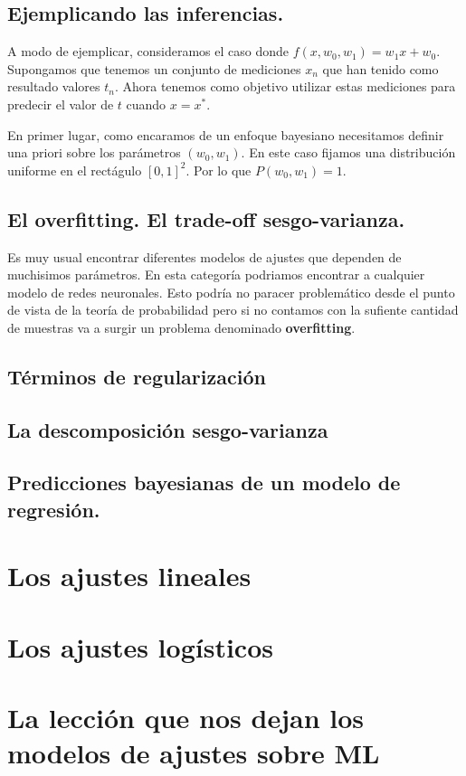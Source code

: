 \subsection{Ejemplicando las inferencias.}
A modo de ejemplicar, consideramos el caso donde $f(x,w_0,w_1) = w_1 x +w_0$. Supongamos que tenemos un conjunto de mediciones $x_n$ que han tenido como resultado valores $t_n$. Ahora tenemos como objetivo utilizar estas mediciones para predecir el valor de $t$ cuando $x=x^*$.

En primer lugar, como encaramos de un enfoque bayesiano necesitamos definir una priori sobre los par\'ametros $(w_0,w_1)$. En este caso fijamos una distribuci\'on uniforme en el rect\'agulo $[0,1]^2$. Por lo que $P(w_0,w_1)=1$.



\subsection{El overfitting. El trade-off sesgo-varianza.}
Es muy usual encontrar diferentes modelos de ajustes que dependen de muchisimos par\'ametros. En esta categor\'ia podriamos encontrar a cualquier modelo de redes neuronales. Esto podr\'ia no paracer problem\'atico desde el punto de vista de la teor\'ia de probabilidad pero si no contamos con la sufiente cantidad de muestras va a surgir un problema denominado {\bf overfitting}.

\subsection{T\'erminos de regularizaci\'on}

\subsection{La descomposici\'on sesgo-varianza}


\subsection{Predicciones bayesianas de un modelo de regresi\'on.}

\section{Los ajustes lineales}

\section{Los ajustes log\'isticos}

\section{La lecci\'on que nos dejan los modelos de ajustes sobre ML}